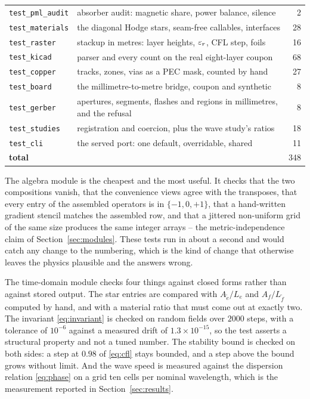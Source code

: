 \begin{table}[H]
\begin{tabular}{@{}l p{8.8cm} r@{}}
    \texttt{test\_pml\_audit} & absorber audit: magnetic share, power balance, silence & 2 \\
    \texttt{test\_materials} & the diagonal Hodge stars, seam-free callables, interfaces & 28 \\
    \texttt{test\_raster}    & stackup in metres: layer heights, $\varepsilon_r$, CFL step, foils & 16 \\
    \texttt{test\_kicad}     & parser and every count on the real eight-layer coupon & 68 \\
    \texttt{test\_copper}    & tracks, zones, vias as a PEC mask, counted by hand & 27 \\
    \texttt{test\_board}     & the millimetre-to-metre bridge, coupon and synthetic & 8 \\
    \texttt{test\_gerber}    & apertures, segments, flashes and regions in millimetres, and the refusal & 8 \\
    \texttt{test\_studies}   & registration and coercion, plus the wave study's ratios & 18 \\
    \texttt{test\_cli}       & the served port: one default, overridable, shared & 11 \\
    \midrule
    \textbf{total} & & 348 \\
    \bottomrule
  \end{tabular}
\end{table}

The algebra module is the cheapest and the most useful. It checks that the two compositions vanish, that the
convenience views agree with the transposes, that every entry of the assembled operators is in
$\{-1,0,+1\}$, that a hand-written gradient stencil matches the assembled row, and that a jittered non-uniform
grid of the same size produces the same integer arrays -- the metric-independence claim of
Section~\ref{sec:modules}. These tests run in about a second and would catch any change to the numbering, which
is the kind of change that otherwise leaves the physics plausible and the answers wrong.

The time-domain module checks four things against closed forms rather than against stored output. The star
entries are compared with $A_{\tilde e}/L_e$ and $A_f/L_{\tilde f}$ computed by hand, and with a material ratio
that must come out at exactly two. The invariant \eqref{eq:invariant} is checked on random fields over $2000$
steps, with a tolerance of $10^{-6}$ against a measured drift of $1.3\times10^{-15}$, so the test asserts a
structural property and not a tuned number. The stability bound is checked on both sides: a step at $0.98$ of
\eqref{eq:cfl} stays bounded, and a step above the bound grows without limit. And the wave speed is measured
against the dispersion relation \eqref{eq:phase} on a grid ten cells per nominal wavelength, which is the
measurement reported in Section~\ref{sec:results}.

